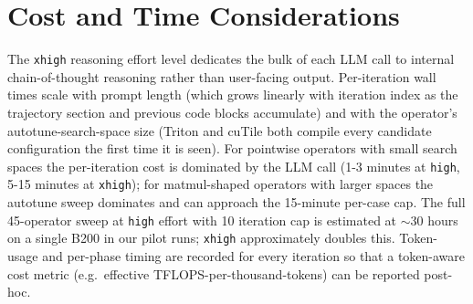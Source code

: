 \documentclass[11pt]{article}
\begin{document}
\section{Cost and Time Considerations}

The \texttt{xhigh} reasoning effort level dedicates the bulk of each
LLM call to internal chain-of-thought reasoning rather than user-facing
output. Per-iteration wall times scale with prompt length (which grows
linearly with iteration index as the trajectory section and previous
code blocks accumulate) and with the operator's autotune-search-space
size (Triton and cuTile both compile every candidate configuration the
first time it is seen). For pointwise operators with small search
spaces the per-iteration cost is dominated by the LLM call (1-3
minutes at \texttt{high}, 5-15 minutes at \texttt{xhigh}); for
matmul-shaped operators with larger spaces the autotune sweep
dominates and can approach the 15-minute per-case cap. The full
45-operator sweep at \texttt{high} effort with 10 iteration cap is
estimated at $\sim$30 hours on a single B200 in our pilot runs;
\texttt{xhigh} approximately doubles this. Token-usage and per-phase
timing are recorded for every iteration so that a token-aware cost
metric (e.g.\ effective TFLOPS-per-thousand-tokens) can be reported
post-hoc.
\end{document}
